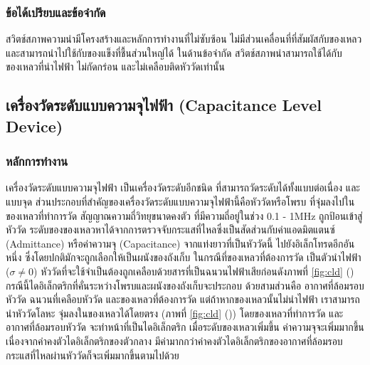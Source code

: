 \documentclass[final,11pt,a4paper]{article}
\begin{document}
\subsubsection{ข้อได้เปรียบและข้อจำกัด}
สวิตช์สภาพความนำมีโครงสร้างและหลักการทำงานที่ไม่ซับซ้อน ไม่มีส่วนเคลื่อนที่ที่สัมผัสกับของเหลว และสามารถนำไปใช้กับของแข็งที่ชื้นส่วนใหญ่ได้ 
ในด้านข้อจำกัด สวิตช์สภาพนำสามารถใช้ได้กับของเหลวที่นำไฟฟ้า ไม่กัดกร่อน และไม่เคลือบติดหัววัดเท่านั้น

\subsection{เครื่องวัดระดับแบบความจุไฟฟ้า (Capacitance Level Device)}
\subsubsection{หลักการทำงาน} 
เครื่องวัดระดับแบบความจุไฟฟ้า เป็นเครื่องวัดระดับอีกชนิด ที่สามารถวัดระดับได้ทั้งแบบต่อเนื่อง และแบบจุด 
ส่วนประกอบที่สำคัญของเครื่องวัดระดับแบบความจุไฟฟ้านี้คือหัววัดหรือโพรบ ที่จุ่มลงไปในของเหลวที่ทำการวัด สัญญาณความถี่วิทยุขนาดคงตัว
ที่มีความถี่อยู่ในช่วง 0.1 - 1MHz ถูกป้อนเข้าสู่หัววัด ระดับของของเหลวหาได้จากการตรวจจับกระแสที่ไหลซึ่งเป็นสัดส่วนกับค่าแอดมิตแตนซ์ (Admittance) 
หรือค่าความจุ (Capacitance) จากแท่งยาวที่เป็นหัววัดนี้ ไปยังอิเล็กโทรดอีกอันหนึ่ง ซึ่งโดยปกติมักจะถูกเลือกให้เป็นผนังของถังเก็บ ในกรณีที่ของเหลวที่ต้องการวัด
เป็นตัวนำไฟฟ้า ($\sigma \neq 0$) หัววัดที่จะใช้จำเป็นต้องถูกเคลือบด้วยสารที่เป็นฉนวนไฟฟ้าเสียก่อนดังภาพที่ \ref{fig:cld} ()  กรณีนี้ไดอิเล็กตริกที่คั่นระหว่างโพรบและผนังของถังเก็บจะประกอบ
ด้วยสามส่วนคือ อากาศที่ล้อมรอบหัววัด ฉนวนที่เคลือบหัววัด และของเหลวที่ต้องการวัด แต่ถ้าหากของเหลวนั้นไม่นำไฟฟ้า เราสามารถนำหัววัดโลหะ
จุ่มลงในของเหลวได้โดยตรง (ภาพที่ \ref{fig:cld} ()) โดยของเหลวที่ทำการวัด และอากาศที่ล้อมรอบหัววัด จะทำหน้าที่เป็นไดอิเล็กตริก เมื่อระดับของเหลวเพิ่มขึ้น 
ค่าความจุจะเพิ่มมากขึ้น เนื่องจากค่าคงตัวไดอิเล็กตริกของตัวกลาง มีค่ามากกว่าค่าคงตัวไดอิเล็กตริกของอากาศที่ล้อมรอบ กระแสที่ไหลผ่านหัววัดก็จะเพิ่มมากขึ้นตามไปด้วย
\end{document}
